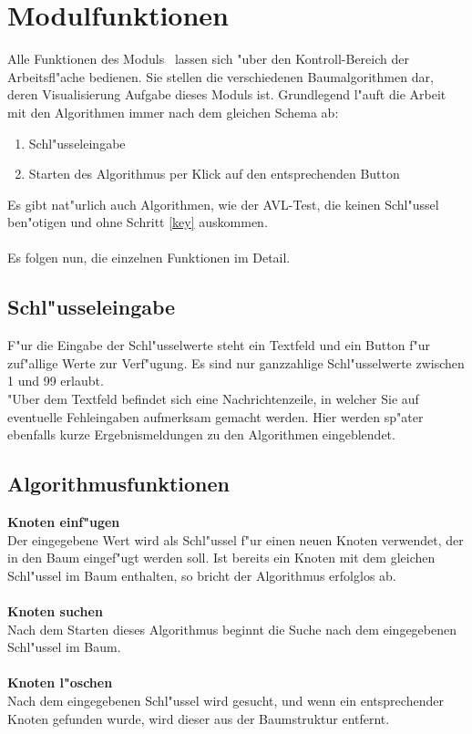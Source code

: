 
\section{Modulfunktionen}

Alle Funktionen des Moduls \AVL \ lassen sich "uber den Kontroll-Bereich der Arbeitsfl"ache bedienen. Sie stellen die 
verschiedenen Baumalgorithmen dar, deren Visualisierung Aufgabe dieses Moduls ist. Grundlegend l"auft die Arbeit mit den Algorithmen immer
nach dem gleichen Schema ab:
\begin{enumerate}
\item \label{key} Schl"usseleingabe
\item Starten des Algorithmus per Klick auf den entsprechenden Button
\end{enumerate}
Es gibt nat"urlich auch Algorithmen, wie der AVL-Test, die keinen Schl"ussel ben"otigen und ohne Schritt \ref{key} auskommen.
\\ \\
Es folgen nun, die einzelnen Funktionen im Detail. 


\medskip
\subsection{Schl"usseleingabe}
F"ur die Eingabe der Schl"usselwerte steht ein Textfeld und ein Button f"ur zuf"allige Werte zur Verf"ugung. 
Es sind nur ganzzahlige Schl"usselwerte zwischen 1 und 99 erlaubt. \\
"Uber dem Textfeld befindet sich eine Nachrichtenzeile, in welcher Sie auf eventuelle Fehleingaben aufmerksam gemacht werden. 
Hier werden sp"ater ebenfalls kurze Ergebnismeldungen zu den Algorithmen eingeblendet. \\


\subsection{Algorithmusfunktionen}
{\bf Knoten einf"ugen} \\
Der eingegebene Wert wird als Schl"ussel f"ur einen neuen Knoten verwendet, der in den Baum eingef"ugt werden soll. Ist 
bereits ein Knoten mit dem gleichen Schl"ussel im Baum enthalten, so bricht der Algorithmus erfolglos ab. \\ \\

{\bf Knoten suchen} \\
Nach dem Starten dieses Algorithmus beginnt die Suche nach dem eingegebenen Schl"ussel im Baum. \\ \\
{\bf Knoten l"oschen} \\
Nach dem eingegebenen Schl"ussel wird gesucht, und wenn ein entsprechender Knoten gefunden wurde, wird dieser aus der 
Baumstruktur entfernt. \\


